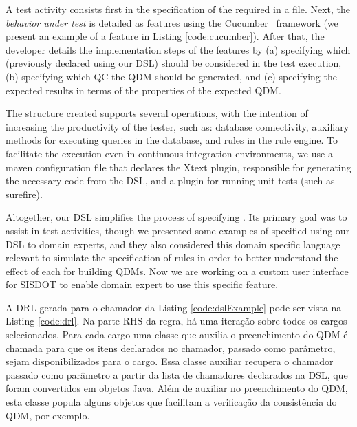 A test activity consists first in the specification of the required \callers in a file. Next, the \emph{behavior under 
test} is detailed as features using the Cucumber~\cite{wynne2017cucumber} framework (we present an 
example of a feature in Listing \ref{code:cucumber}). After that, the developer details 
the implementation steps of the features by (a) specifying which \callers (previously declared using our DSL) should be considered 
in the test execution, (b) specifying which QC the QDM should be generated, and (c) specifying the expected results in terms 
of the properties of the expected QDM. 

The structure created supports several operations, with the intention 
of increasing the productivity of the tester, such as: database connectivity, auxiliary methods for executing queries 
in the database, and rules in the rule engine. To facilitate the execution even in continuous integration 
environments, we use a maven configuration file that declares the Xtext plugin, responsible for 
generating the necessary code from the DSL, and a plugin for running unit tests (such as surefire).


Altogether, our DSL simplifies the process of specifying \callers. Its primary goal was to 
assist in test activities, though we presented some examples of \callers specified using 
our DSL to domain experts, and they also considered this domain specific language relevant 
to simulate the specification of rules in order to better understand the effect of each 
\shc for building QDMs. Now we are working on a custom user interface for SISDOT to enable domain 
expert to use this specific feature. 


 {\color{red}A DRL gerada para o chamador da Listing \ref{code:dslExample} pode ser vista na} Listing \ref{code:drl}.  {\color{red} Na parte RHS da regra, há uma iteração sobre todos os cargos selecionados. Para cada cargo uma classe que auxilia o preenchimento do QDM é chamada para que os itens declarados no chamador, passado como parâmetro, sejam disponibilizados para o cargo. Essa classe auxiliar recupera o chamador passado como parâmetro a partir da lista de chamadores declarados na DSL, que foram convertidos em objetos Java. Além de auxiliar no preenchimento do QDM, esta classe popula alguns objetos que facilitam a verificação da consistência do QDM, por exemplo.}


